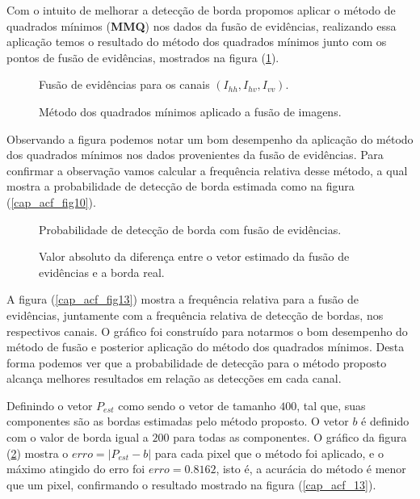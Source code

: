 Com o intuito de melhorar a detecção de borda propomos aplicar o método de quadrados mínimos (\textbf{MMQ}) nos dados da fusão de evidências, realizando essa aplicação temos o resultado do método dos quadrados mínimos junto com os pontos de fusão de evidências, mostrados na figura (\ref{cap_acf_fig12}).
\begin{figure}[hbt]
	\caption{Fusão de evidências para os canais $\left(I_{hh}, I_{hv}, I_{vv}\right)$.}
\label{cap_acf_fig11}
\endminipage\hfill
{}
\caption{Método dos quadrados mínimos aplicado a fusão de imagens.}
\label{cap_acf_fig12}
\endminipage\hfill
\end{figure}
Observando a figura podemos notar um bom desempenho da aplicação do método dos quadrados mínimos nos dados provenientes da fusão de evidências. Para confirmar a observação vamos calcular a frequência relativa desse método, a qual mostra a probabilidade de detecção de borda estimada como na figura (\ref{cap_acf_fig10}).
\begin{figure}[hbt]
	\caption{Probabilidade de detecção de borda com fusão de evidências.}
\label{cap_acf_fig13}
\endminipage\hfill
{}
	\caption{Valor absoluto da diferença entre o vetor estimado da fusão de evidências e a borda real.}
\label{cap_acf_fig14}
\endminipage\hfill
\end{figure}

A figura (\ref{cap_acf_fig13}) mostra a frequência relativa para a fusão de evidências, juntamente com a frequência relativa de detecção de bordas, nos respectivos canais. O gráfico foi construído para notarmos o bom desempenho do método de fusão e posterior aplicação do método dos quadrados mínimos. Desta forma podemos ver que a probabilidade de detecção para o método proposto alcança melhores resultados em relação as detecções em cada canal. 

 Definindo o vetor $P_{est}$ como sendo o vetor de tamanho $400$, tal que, suas componentes são as bordas estimadas pelo método proposto. O vetor $b$ é definido com o valor de borda igual a $200$ para todas as componentes. O gráfico da figura (\ref{cap_acf_fig14}) mostra o $erro=|P_{est}-b|$ para cada pixel que o método foi aplicado, e o máximo atingido do erro foi $erro=0.8162$, isto é, a acurácia do método é menor que um pixel, confirmando o resultado mostrado na figura (\ref{cap_acf_13}).

